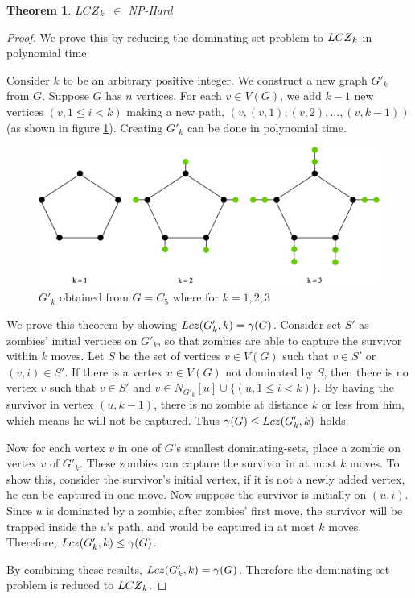 \documentclass[1p]{elsarticle}
\newtheorem{theorem}{Theorem}
\newcommand{\NPZ}{\ooalign{$Z$\cr\hfil\rule[.8ex]{.3em}{.09ex}\hfil\cr}}
\newcommand{\zn}{\ooalign{$z$\cr\hfil\rule[.5ex]{.2em}{.08ex}\hfil\cr}}
\begin{document}
	\begin{theorem}
		$LC\NPZ_k$ $\in$ NP-Hard
	\end{theorem}
	\begin{proof}
		We prove this by reducing the dominating-set problem to $LC\NPZ_k$ in polynomial time.

		Consider $k$ to be an arbitrary positive integer. We construct a new graph $G'_k$ from $G$. Suppose $G$ has $n$
		vertices. For each $v \in V(G)$, we add $k-1$ new vertices $(v,1 \leq i < k)$ making a new path,
		$(v,(v,1),(v,2),...,(v,k-1))$ (as shown in figure \ref{fig:p7}). Creating $G'_k$ can be done in polynomial time.

		\begin{figure}[h!]
			\centering
			\includegraphics[width=0.9\linewidth]{LCZ.png}
			\caption{$G'_k$ obtained from $G = C_5$ where for $k = 1,2,3$}
			\label{fig:p7}
		\end{figure}		


		We prove this theorem by showing $Lc\zn(G'_k,k) = \gamma(G)$. Consider set $S'$ as zombies' initial vertices on $G'_k$,
		so that zombies are able to capture the survivor within $k$ moves. Let $S$ be the set of vertices $v \in V(G)$
		such that $v \in S'$ or $(v,i) \in S'$. If there is a vertex $u \in V(G)$ not dominated by $S$, then there is no
		vertex $v$ such that $v \in S'$ and $v \in N_{G'_k}[u] \cup \{(u,1 \leq i < k)\}$. By having the survivor in
		vertex $(u, k-1)$, there is no zombie at distance $k$ or less from him, which means he will not be captured.
		Thus $\gamma(G) \leq Lc\zn(G'_k,k)$ holds.
		
		Now for each vertex $v$ in one of $G$'s smallest dominating-sets, place a zombie on vertex $v$ of $G'_k$. These
		zombies can capture the survivor in at most $k$ moves. To show this, consider the survivor's initial vertex, if it
		is not a newly added vertex, he can be captured in one move. Now suppose the survivor is initially on $(u,i)$. Since
		$u$ is dominated by a zombie, after zombies' first move, the survivor will be trapped inside the $u$'s path, and would
		be captured in at most $k$ moves. Therefore, $Lc\zn(G'_k,k) \leq \gamma(G)$.

		By combining these results, $Lc\zn(G'_k,k) = \gamma(G)$. Therefore the dominating-set problem is reduced to
		$LC\NPZ_k$.

	\end{proof}
\end{document}
